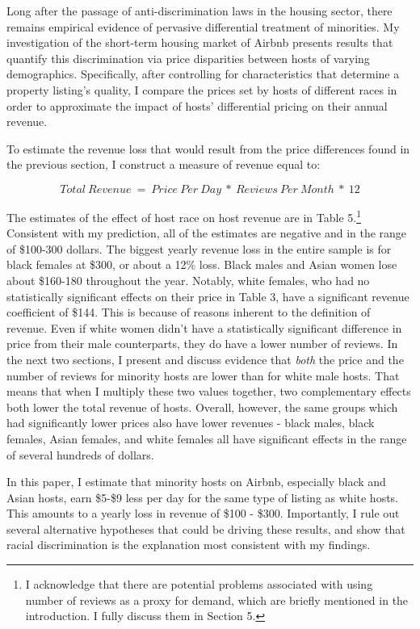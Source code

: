 
Long after the passage of anti-discrimination laws in the housing sector, there remains empirical evidence of pervasive differential treatment of minorities. My investigation of the short-term housing market of Airbnb presents results that quantify this discrimination via price disparities between hosts of varying demographics. Specifically, after controlling for characteristics that determine a property listing's quality, I compare the prices set by hosts of different races in order to approximate the impact of hosts' differential pricing on their annual revenue.

To estimate the revenue loss that would result from the price differences found in the previous section, I construct a measure of revenue equal to: 

\[Total \: Revenue \ = \ Price \: Per \: Day \ * \ Reviews \: Per \: Month \ * \ 12\] 

The estimates of the effect of host race on host revenue are in Table 5.\footnote{I acknowledge that there are potential problems associated with using number of reviews as a proxy for demand, which are briefly mentioned in the introduction. I fully discuss them in Section 5.} Consistent with my prediction, all of the estimates are negative and in the range of \$100-300 dollars. The biggest yearly revenue loss in the entire sample is for black females at \$300, or about a 12\% loss. Black males and Asian women lose about \$160-180 throughout the year. Notably, white females, who had no statistically significant effects on their price in Table 3, have a significant revenue coefficient of \$144. This is because of reasons inherent to the definition of revenue. Even if white women didn't have a statistically significant difference in price from their male counterparts, they do have a lower number of reviews. In the next two sections, I present and discuss evidence that \textit{both} the price and the number of reviews for minority hosts are lower than for white male hosts. That means that when I multiply these two values together, two complementary effects both lower the total revenue of hosts. Overall, however, the same groups which had significantly lower prices also have lower revenues - black males, black females, Asian females, and white females all have significant effects in the range of several hundreds of dollars. 


In this paper, I estimate that minority hosts on Airbnb, especially black and Asian hosts, earn \$5-\$9 less per day for the same type of listing as white hosts. This amounts to a yearly loss in revenue of \$100 - \$300. Importantly, I rule out several alternative hypotheses that could be driving these results, and show that racial discrimination is the explanation most consistent with my findings. 

